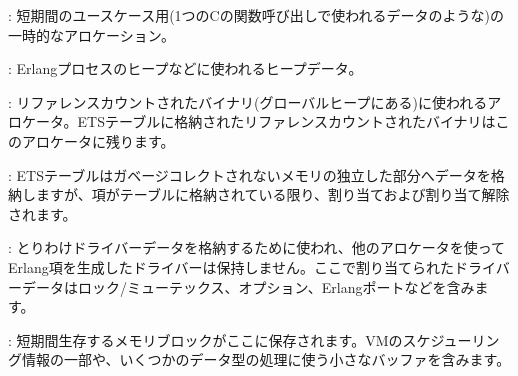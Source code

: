 \begin{enumerate*}
    \item {}: 短期間のユースケース用(1つのCの関数呼び出しで使われるデータのような)の一時的なアロケーション。
    \item {}: Erlangプロセスのヒープなどに使われるヒープデータ。
    \item {}: リファレンスカウントされたバイナリ(グローバルヒープにある)に使われるアロケータ。ETSテーブルに格納されたリファレンスカウントされたバイナリはこのアロケータに残ります。
    \item {}: ETSテーブルはガベージコレクトされないメモリの独立した部分へデータを格納しますが、項がテーブルに格納されている限り、割り当ておよび割り当て解除されます。
    \item {}: とりわけドライバーデータを格納するために使われ、他のアロケータを使ってErlang項を生成したドライバーは保持しません。ここで割り当てられたドライバーデータはロック/ミューテックス、オプション、Erlangポートなどを含みます。
    \item {}: 短期間生存するメモリブロックがここに保存されます。VMのスケジューリング情報の一部や、いくつかのデータ型の処理に使う小さなバッファを含みます。

\end{enumerate*}
